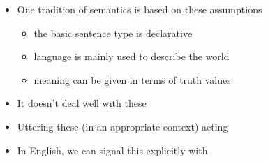 \documentclass[a4paper,landscape,headrule,footrule,xetex]{foils}
\begin{document}
\begin{itemize}
\item One tradition of semantics is based on these assumptions
  \begin{itemize}
  \item the basic sentence type is declarative
  \item language is mainly used to describe the world
  \item meaning can be given in terms of truth values
  \end{itemize}
\item It doesn't deal well with these
  \begin{exe}
    \ex {}
    \ex {}
    \ex {}
    \ex {}
    \ex {}
  \end{exe}
\end{itemize}


\begin{exe}
  \ex {}
  \ex {}
  \ex {} 
  \ex {}
  \ex {}
\end{exe}

\begin{itemize}
\item Uttering these (in an appropriate context)  acting
\\  
\item In English, we can signal this explicitly with 
\end{itemize}
\end{document}
